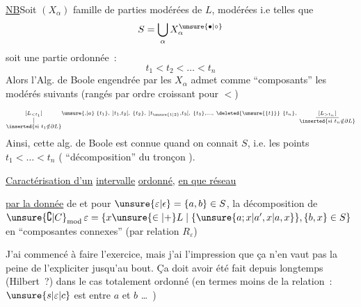 \uline{NB}\qquad Soit $(X_\alpha)$ famille  de parties modérées de $L$,   modérées i.e telles que
\[
S=\bigcup_\alpha X_\alpha^{\unsure{\bullet|\circ}}
\]
soit une partie  ordonnée~:
\[
t_1<t_2<\ldots<t_n
\]
Alors l'Alg. de Boole engendrée par les $X_\alpha$  admet comme   ``composants'' les  modérés  suivants (rangés par ordre croissant pour $<$)
\[
\scriptstyle
\underset{\substack{\vert\\\inserted{\text{si }t_1\notin\partial L}}}{[L_{<t_1}]}\unsure{,|a}\;
\{t_1\},\ ]t_1,t_2[,\ \{t_2\},\ ]t_{\unsure{1|2}},t_3[,\ \{t_3\},\ldots,\
\deleted{\unsure{\{t\}}}\ \{t_n\},\
\underset{\substack{\rule{3em}{0.35pt}\\\inserted{\text{si }t_n\notin\partial L}}}{[L_{>t_n}]}
\]
Ainsi, cette alg. de Boole est connue quand on connait $S$, i.e. les points $t_1<\ldots<t_n$ ( ``décomposition''  du tronçon ).

\scanpage{41}\mspage{40}
\uline{Caractérisation d'un} \uline{intervalle}  \uline{ordonné}, \uline{en  que réseau}

\uline{par la donnée} de
\diagram{\begin{tikzcd}[ampersand replacement=\&,row sep=0.75em,column sep=0.15em]
S \& {}\subset\unsure{\mathrm P|\mathcal P}_2(\unsure{L|\mathcal L})\\
\makebox[0pt][c]{\(\unsure{\mathrm{Drop}|\mathrm{Drp}}_2(L)\)}\arrow[u,equal] \&
\end{tikzcd}}
et pour $\unsure{\varepsilon|\epsilon}=\{a,b\}\in S$, la décomposition de  $\unsure{\complement|C}_{\mathrm{mod}}\,\varepsilon=\{x\unsure{\in|+}L\mid\{\unsure{a;x|a',x|a,x}\},\{b,x\}\in S\}$ en ``composantes connexes'' (par relation $R_\varepsilon$)

J'ai commencé à faire l'exercice, mais j'ai l'impression que ça n'en vaut pas la peine de l'expliciter jusqu'au bout. Ça doit avoir été fait depuis longtemps (Hilbert~?) dans le cas totalement ordonné  (en termes  moins de la relation~: $\unsure{s|\varepsilon|c}$ est entre $a$ et $b$ \ldots\ )
